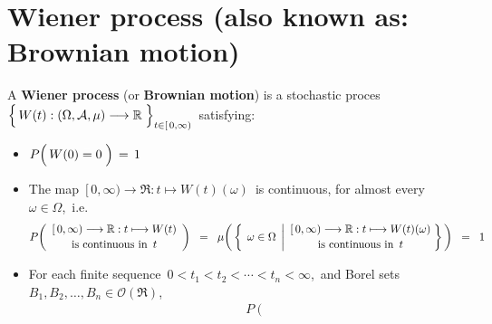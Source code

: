 

\section{Wiener process (also known as: Brownian motion)}
\setcounter{theorem}{0}
\setcounter{equation}{0}


\renewcommand{\theenumi}{\roman{enumi}}
\renewcommand{\labelenumi}{\textnormal{(\theenumi)}$\;\;$}


\begin{definition}
\mbox{}
\vskip 0.1cm
\noindent
A \textbf{Wiener process} (or \textbf{Brownian motion}) is a stochastic proces
\,$\left\{\,\overset{{\color{white}.}}{W}(t) : (\Omega,\mathcal{A},\mu) \longrightarrow \Re \;\right\}_{t \in[\,0,\infty)}$\,
satisfying:
\begin{itemize}
\item
	$P\!\left(\,W(0) \overset{{\color{white}-}}{=} 0 \;\right) \, = \, 1$
\item
	The map
	\,$[\,0,\infty) \longrightarrow \Re : t \longmapsto W(t)(\omega)$\,
	is continuous, for almost every \,$\omega \in \Omega$,\, i.e.
	\begin{equation*}
	P\!\left(
		\begin{array}{c}
		[\,0,\infty) \longrightarrow \Re : t \longmapsto W(t)
		\\
		\overset{{\color{white}.}}{\textnormal{is continuous in \,$t$}}
		\end{array}
		\right)
	\;\; = \;\;
	\mu\!\left(\,\left\{\;\,
		\omega \in \Omega
		\;\left\vert
		\begin{array}{c}
		[\,0,\infty) \longrightarrow \Re : t \longmapsto W(t)(\omega)
		\\
		\overset{{\color{white}.}}{\textnormal{is continuous in \,$t$}}
		\end{array}
		\right.
		\!\!\right\}\,\right)
	\;\; = \;\; 1
	\end{equation*}
\item
	For each finite sequence \,$0 < t_{1} < t_{2} < \cdots < t_{n} < \infty$,\,
	and Borel sets \,$B_{1}, B_{2}, \ldots, B_{n} \in \mathcal{O}(\Re)$,\,
	\begin{eqnarray*}
	&&
		P\!\left(\,

\end{eqnarray*}
\end{itemize}
\end{definition}
